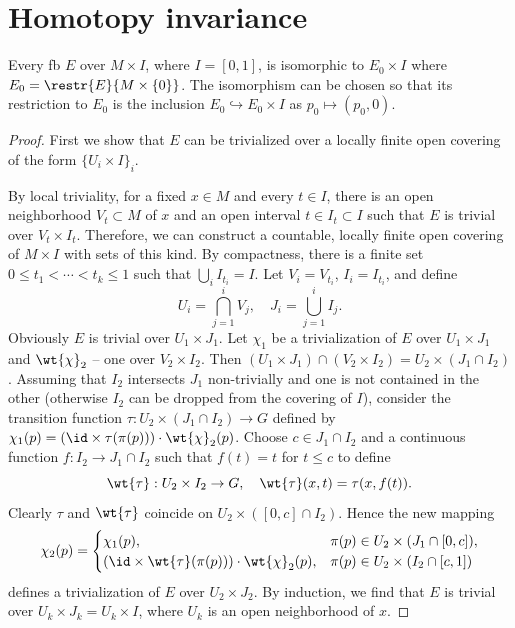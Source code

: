 \section{Homotopy invariance}


\begin{thm}\label{bundles over MxI}
    Every \gls{fb} $E$ over $M\times I$, where $I=[0,1]$, is isomorphic to $E_0\times I$ where $E_0=\restr{E}{M\times\{0\}}$. The isomorphism can be chosen so that its restriction to $E_0$ is the inclusion $E_0\hookrightarrow E_0\times I$ as $p_0\mapsto (p_0,0)$.
\end{thm}
\begin{proof}
    First we show that $E$ can be trivialized over a locally finite open covering of the form $\{U_i\times I\}_i$.

    By local triviality, for a fixed $x\in M$ and every $t\in I$, there is an open neighborhood $V_t\subset M$ of $x$ and an open interval $t\in I_t\subset I$ such that $E$ is trivial over $V_t\times I_t$. Therefore, we can construct a countable, locally finite open covering of $M\times I$ with sets of this kind. By compactness, there is a finite set $0\leq t_1<\cdots<t_k\leq 1$ such that $\bigcup_i I_{t_i}=I$. Let $V_i=V_{t_i}$, $I_i=I_{t_i}$, and define 
    \[
        U_i=\bigcap_{j=1}^i V_j,\quad J_i=\bigcup_{j=1}^i I_j.
    \]
    Obviously $E$ is trivial over $U_1\times J_1$. Let $\chi_1$ be a trivialization of $E$ over $U_1\times J_1$ and $\wt{\chi}_2$ -- one over $V_2\times I_2$. Then $(U_1\times J_1)\cap (V_2\times I_2)=U_2\times (J_1\cap I_2)$. Assuming that $I_2$ intersects $J_1$ non-trivially and one is not contained in the other (otherwise $I_2$ can be dropped from the covering of $I$), consider the transition function $\tau:U_2\times(J_1\cap I_2)\to G$ defined by $\chi_1(p)=\left(\id\times    \tau(\pi(p))\right)\cdot \wt{\chi}_2(p)$. Choose $c\in J_1\cap I_2$ and a continuous function $f:I_2\to J_1\cap I_2$ such that $f(t)=t$ for $t\leq c$ to define 
    \[
        \wt{\tau}:U_2\times I_2\to G,\quad \wt{\tau}(x,t)=\tau(x,f(t)).
    \]
    Clearly $\tau$ and $\wt{\tau}$ coincide on $U_2\times([0,c]\cap I_2)$. Hence the new mapping
    \[
    \chi_2(p)=\begin{cases}
    \chi_1(p), & \pi(p)\in U_2\times(J_1\cap[0,c]),\\
    (\id\times\wt{\tau}(\pi(p)))\cdot \wt{\chi}_2(p), & \pi(p)\in U_2\times(I_2\cap[c,1])
    \end{cases}
    \]
    defines a trivialization of $E$ over $U_2\times J_2$. By induction, we find that $E$ is trivial over $U_k\times J_k=U_k\times I$, where $U_k$ is an open neighborhood of $x$. 


\end{proof}
